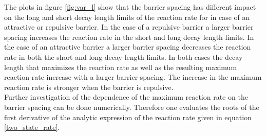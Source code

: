 The plots in figure \ref{fig:var_l} show that the barrier spacing has different impact on the long and short decay length limits of the reaction rate for in case of an attractive or repulsive barrier.
In the case of a repulsive barrier a larger barrier spacing increases the reaction rate in the short and long decay length limits. In the case of an attractive barrier a larger barrier spacing decreases the reaction rate in both the short and long decay length limits. In both cases the decay length that maximizes the reaction rate as well as the resulting maximum reaction rate increase with a larger barrier spacing. The increase in the maximum reaction rate is stronger when the barrier is repulsive.\\
Further investigation of the dependence of the maximum reaction rate on the barrier spacing can be done numerically. Therefore one evaluates the roots of the first derivative of the analytic expression of the reaction rate given in equation \eqref{two_state_rate}. \\
